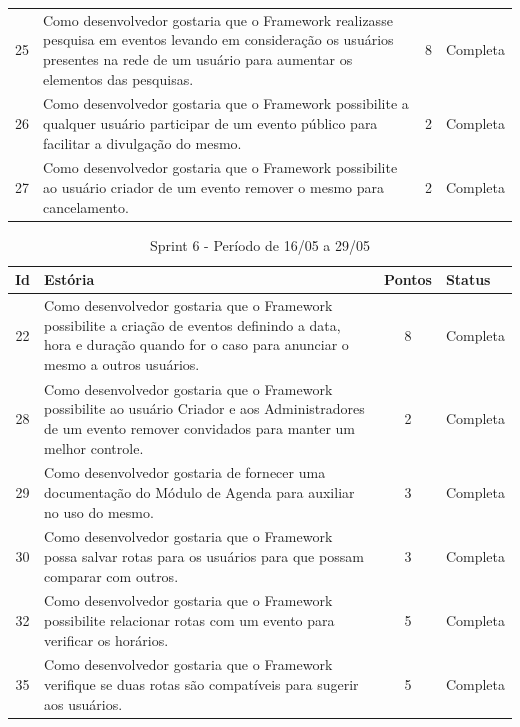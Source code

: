 \begin{apendicesenv}
\begin{table}[!h]
\begin{adjustbox}{width=\textwidth}
\begin{tabular}{@{}cp{10cm}cl@{}}
25 & Como desenvolvedor gostaria que o Framework realizasse pesquisa em eventos levando em consideração os usuários presentes na rede de um usuário para aumentar os elementos das pesquisas. & 8 & Completa \\

26 & Como desenvolvedor gostaria que o Framework possibilite a qualquer usuário participar de um evento público para facilitar a divulgação do mesmo. & 2 & Completa \\

27 & Como desenvolvedor gostaria que o Framework possibilite ao usuário criador de um evento remover o mesmo para cancelamento. & 2 & Completa \\ \bottomrule
\end{tabular}
\end{adjustbox}
\end{table}

\begin{table}[!h]
\centering
\caption{Sprint 6 - Período de 16/05 a 29/05}
\label{sprint_6}
\begin{adjustbox}{width=\textwidth}
\begin{tabular}{@{}cp{10cm}cl@{}}
\toprule
\textbf{Id}  & \textbf{Estória} & \textbf{Pontos} & \textbf{Status} \\ \midrule
22 & Como desenvolvedor gostaria que o Framework possibilite a criação de eventos definindo a data, hora e duração quando for o caso para anunciar o mesmo a outros usuários. & 8 & Completa \\ 

28 & Como desenvolvedor gostaria que o Framework possibilite ao usuário Criador e aos Administradores de um evento remover convidados para manter um melhor controle. & 2 & Completa \\

29 & Como desenvolvedor gostaria de fornecer uma documentação do Módulo de Agenda para auxiliar no uso do mesmo. & 3 & Completa \\

30 & Como desenvolvedor gostaria que o Framework possa salvar rotas para os usuários para que possam comparar com outros. & 3 & Completa \\

32 & Como desenvolvedor gostaria que o Framework possibilite relacionar rotas com um evento para verificar os horários. & 5 & Completa \\

35 & Como desenvolvedor gostaria que o Framework verifique se duas rotas são compatíveis para sugerir aos usuários. & 5 & Completa \\


\end{tabular}
\end{adjustbox}
\end{table}
\end{apendicesenv}
